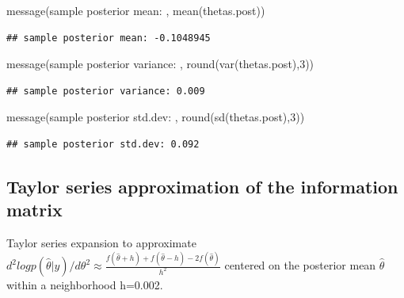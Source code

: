 \documentclass[
]{book}
\newenvironment{Shaded}{\begin{snugshade}}{\end{snugshade}}
\newcommand{\DecValTok}[1]{\textcolor[rgb]{0.00,0.00,0.81}{#1}}
\newcommand{\FunctionTok}[1]{\textcolor[rgb]{0.00,0.00,0.00}{#1}}
\newcommand{\NormalTok}[1]{#1}
\newcommand{\StringTok}[1]{\textcolor[rgb]{0.31,0.60,0.02}{#1}}
\theoremstyle{definition}
\theoremstyle{definition}
\theoremstyle{definition}
\theoremstyle{definition}
\theoremstyle{remark}
\begin{document}
\begin{Shaded}
\begin{Highlighting}[]
 \FunctionTok{message}\NormalTok{(}\StringTok{\textquotesingle{}sample posterior mean: \textquotesingle{}}\NormalTok{, }\FunctionTok{mean}\NormalTok{(thetas.post))}
\end{Highlighting}
\end{Shaded}

\begin{verbatim}
## sample posterior mean: -0.1048945
\end{verbatim}

\begin{Shaded}
\begin{Highlighting}[]
 \FunctionTok{message}\NormalTok{(}\StringTok{\textquotesingle{}sample posterior variance: \textquotesingle{}}\NormalTok{, }\FunctionTok{round}\NormalTok{(}\FunctionTok{var}\NormalTok{(thetas.post),}\DecValTok{3}\NormalTok{))}
\end{Highlighting}
\end{Shaded}

\begin{verbatim}
## sample posterior variance: 0.009
\end{verbatim}

\begin{Shaded}
\begin{Highlighting}[]
 \FunctionTok{message}\NormalTok{(}\StringTok{\textquotesingle{}sample posterior std.dev: \textquotesingle{}}\NormalTok{, }\FunctionTok{round}\NormalTok{(}\FunctionTok{sd}\NormalTok{(thetas.post),}\DecValTok{3}\NormalTok{))}
\end{Highlighting}
\end{Shaded}

\begin{verbatim}
## sample posterior std.dev: 0.092
\end{verbatim}

\hypertarget{taylor-series-approximation-of-the-information-matrix}{%
\subsection{Taylor series approximation of the information matrix}\label{taylor-series-approximation-of-the-information-matrix}}

Taylor series expansion to approximate \(d^2log p(\hat{\theta}|y)/d\theta^2 \approx \frac{f(\hat{\theta}+h)+f(\hat{\theta}-h)-2f(\hat{\theta})}{h^2}\) centered on the posterior mean \(\hat{\theta}\) within a neighborhood h=0.002.
\end{document}
